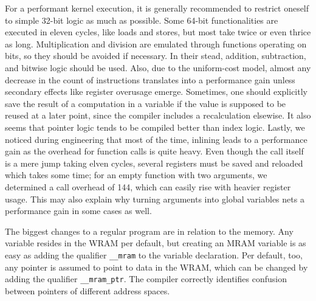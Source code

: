 For a performant kernel execution, it is generally recommended to restrict oneself to simple 32-bit logic as much as possible.
Some 64-bit functionalities are executed in eleven cycles, like loads and stores, but most take twice or even thrice as long.
Multiplication and division are emulated through functions operating on bits, so they should be avoided if necessary.
In their stead, addition, subtraction, and bitwise logic should be used.
Also, due to the uniform-cost model, almost any decrease in the count of instructions translates into a performance gain unless secondary effects like register overusage\todo{!} emerge.
Sometimes, one should explicitly save the result of a computation in a variable if the value is supposed to be reused at a later point, since the compiler includes a recalculation elsewise.
It also seems that pointer logic tends to be compiled better than index logic.
Lastly, we noticed during engineering that most of the time, inlining leads to a performance gain as the overhead for function calls is quite heavy.
Even though the call itself is a mere jump taking elven cycles, several registers must be saved and reloaded which takes some time;
for an empty function with two arguments, we determined a call overhead of \qty{144}{\cycle}, which can easily rise with heavier register usage.
This may also explain why turning arguments into global variables nets a performance gain in some cases as well.

The biggest changes to a regular program are in relation to the memory.
Any variable resides in the \ac{WRAM} per default, but creating an \ac{MRAM} variable is as easy as adding the qualifier \lstinline|__mram| to the variable declaration.
Per default, too, any pointer is assumed to point to data in the \ac{WRAM}, which can be changed by adding the qualifier \lstinline|__mram_ptr|.
The compiler correctly identifies confusion between pointers of different address spaces.

